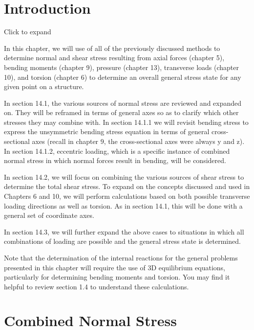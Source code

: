 \documentclass[
  letterpaper,
  DIV=11,
  numbers=noendperiod]{scrreprt}
\begin{document}
\section*{Introduction}\label{introduction-14}


Click to expand

In this chapter, we will use of all of the previously discussed methods
to determine normal and shear stress resulting from axial forces
(chapter 5), bending moments (chapter 9), pressure (chapter 13),
transverse loads (chapter 10), and torsion (chapter 6) to determine an
overall general stress state for any given point on a structure.

In section 14.1, the various sources of normal stress are reviewed and
expanded on. They will be reframed in terms of general axes so as to
clarify which other stresses they may combine with. In section 14.1.1 we
will revisit bending stress to express the unsymmetric bending stress
equation in terms of general cross-sectional axes (recall in chapter 9,
the cross-sectional axes were always y and z). In section 14.1.2,
eccentric loading, which is a specific instance of combined normal
stress in which normal forces result in bending, will be considered.

In section 14.2, we will focus on combining the various sources of shear
stress to determine the total shear stress. To expand on the concepts
discussed and used in Chapters 6 and 10, we will perform calculations
based on both possible transverse loading directions as well as torsion.
As in section 14.1, this will be done with a general set of coordinate
axes.

In section 14.3, we will further expand the above cases to situations in
which all combinations of loading are possible and the general stress
state is determined.

Note that the determination of the internal reactions for the general
problems presented in this chapter will require the use of 3D
equilibrium equations, particularly for determining bending moments and
torsion. You may find it helpful to review section 1.4 to understand
these calculations.

\section{Combined Normal Stress}\label{combined-normal-stress}
\end{document}
